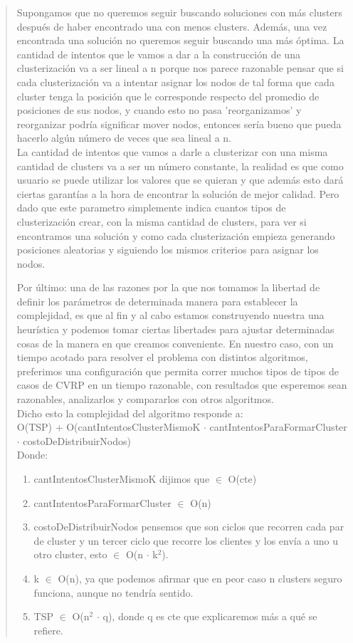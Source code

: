 \documentclass[11pt,a4paper]{article}
\begin{document}
\begin{verse}
Supongamos que no queremos seguir buscando soluciones con más clusters después de haber encontrado una con menos clusters. Además, una vez encontrada una solución no queremos seguir buscando una más óptima. La cantidad de intentos que le vamos a dar a la construcción de una clusterización va a ser lineal a n porque nos parece razonable pensar que si cada clusterización va a intentar asignar los nodos de tal forma que cada cluster tenga la posición que le corresponde respecto del promedio de posiciones de sus nodos, y cuando esto no pasa 'reorganizamos' y reorganizar podría significar mover nodos, entonces sería bueno que pueda hacerlo algún número de veces que sea lineal a n.\\
La cantidad de intentos que vamos a darle a clusterizar con una misma cantidad de clusters va a ser un número constante, la realidad es que como usuario se puede utilizar los valores que se quieran y que además esto dará ciertas garantías a la hora de encontrar la solución de mejor calidad. Pero dado que este parametro simplemente indica cuantos tipos de clusterización crear, con la misma cantidad de clusters, para ver si encontramos una solución y como cada clusterización empieza generando posiciones aleatorias y siguiendo los mismos criterios para asignar los nodos.

Por último: una de las razones por la que nos tomamos la libertad de definir los parámetros de determinada manera para establecer la complejidad, es que al fin y al cabo estamos construyendo nuestra una heurística y podemos tomar ciertas libertades para ajustar determinadas cosas de la manera en que creamos conveniente. En nuestro caso, con un tiempo acotado para resolver el problema con distintos algoritmos, preferimos una configuración que permita correr muchos tipos de tipos de casos de CVRP en un tiempo razonable, con resultados que esperemos sean razonables, analizarlos y compararlos con otros algoritmos. 
\\
Dicho esto la complejidad del algoritmo responde a: \\
O(TSP) + O(cantIntentosClusterMismoK $\cdot$ cantIntentosParaFormarCluster $\cdot$ costoDeDistribuirNodos)\\
Donde: 
\begin{enumerate}
\item cantIntentosClusterMismoK dijimos que $\in$ O(cte)\\
\item cantIntentosParaFormarCluster $\in$ O(n)

\item costoDeDistribuirNodos pensemos que son ciclos que recorren cada par de cluster y un tercer ciclo que recorre los clientes y los envía a uno u otro cluster, esto $\in$ O(n $\cdot$ k$^{2}$).
\item k $\in$ O(n), ya que podemos afirmar que en peor caso n clusters seguro funciona, aunque no tendría sentido.
\item TSP $\in$ O(n$^{2}$ $\cdot$ q), donde q es cte que explicaremos más a qué se refiere.
\end{enumerate}


\end{verse}
\end{document}

